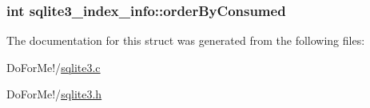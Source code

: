 \hypertarget{structsqlite3__index__info_a5515d9de0f37f68d7e0930c20a668b29}{
\subsubsection[{order\-By\-Consumed}]{\setlength{\rightskip}{0pt plus 5cm}int sqlite3\-\_\-index\-\_\-info\-::order\-By\-Consumed}}\label{structsqlite3__index__info_a5515d9de0f37f68d7e0930c20a668b29}


The documentation for this struct was generated from the following files\-:\begin{DoxyCompactItemize}
\item 
Do\-For\-Me!/\hyperlink{sqlite3_8c}{sqlite3.\-c}\item 
Do\-For\-Me!/\hyperlink{sqlite3_8h}{sqlite3.\-h}\end{DoxyCompactItemize}
